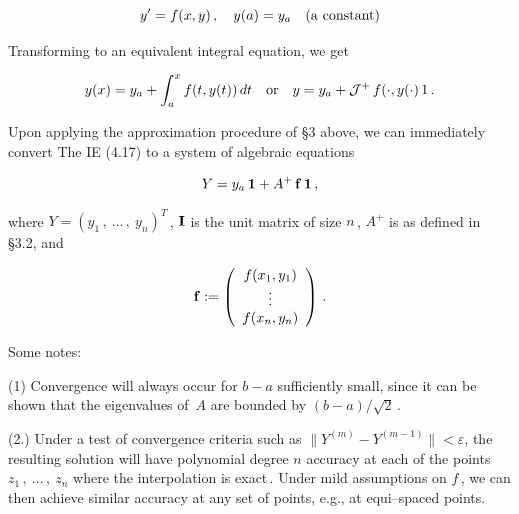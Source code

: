 \documentclass[11pt]{article}
\begin{document}
\begin{description}
 \begin{equation}%
   y^\prime = f(x,y)\,,\ \ \ y(a) = y_a \ \ \ ({\rm a\ constant})
\label{equation:4.16}
 \end{equation}

 \noindent Transforming to an equivalent integral equation, we get

 \begin{equation}%
   y(x) = y_a + \displaystyle \int_a^x f(t,y(t))\,dt \ \ \ {\rm or}\ \ \ y =
   y_a + {\cal J}^+ \, f(\cdot,y(\cdot) \, 1\,.
   \label{equation:4.17}
 \end{equation}

 \vspace{.1in} \noindent Upon applying the approximation procedure of
 \S3 above, we can immediately convert The IE (4.17) to a system of
 algebraic equations

 \begin{equation}%
   Y = y_a\,{\bf 1} + A^+\,{\bf f}\,{\bf 1}\,,
   \label{equation:4.18}
 \end{equation}

 \noindent where $Y = (y_1\,,\ \ldots\,,\ y_n)^T$\,, ${\bf I}$ is the
 unit matrix of size $n$\,, $A^+$ is as defined in \S3.2, and

 \begin{equation}%
   {\bf f} := \left(\begin{array}{c}
     f(x_1,y_1) \\
     \vdots \\
     f(x_n,y_n)
   \end{array}
   \right)\,.
   \label{equation:4.19}
 \end{equation}

 \vspace{.1in} \noindent Some notes:
 \begin{description}
   \item{(1)}  Convergence will always occur for $b-a$ 
  sufficiently small, since it can be shown that the eigenvalues of 
  $\,A$ are bounded by $(b-a)/\sqrt{2}$\,.

\item{(2.)} Under a test of convergence criteria such as $\|Y^{(m)} -
  Y^{(m-1)}\| < {\varepsilon}$, the resulting solution will have
  polynomial degree $n$ accuracy at each of the points
  $z_1\,,\ \ldots\,,\ z_n$ where the interpolation is exact\,.  Under
  mild assumptions on $f$\,, we can then achieve similar accuracy at
  any set of points, e.g., at equi--spaced points.


\end{description}
\end{description}
\end{document}
